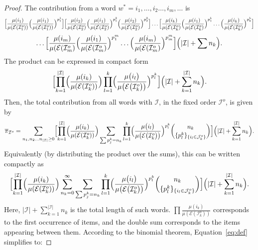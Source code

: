 \documentclass[11pt]{article}
\begin{document}
\begin{proof}
	The contribution from a word $w^*=i_1,\dots,i_2\dots,i_m,\dots$ is $$
	\Bigl[\frac{\mu(i_1)}{\mu(\mathcal{E}(\mathcal{I}^o_1))}
	\Bigl(\frac{\mu(i_1)}{\mu(\mathcal{E}(\mathcal{I}^o_1))}\Bigr)^{p_1^1}\Bigr]
	\Bigl[\frac{\mu(i_2)}{\mu(\mathcal{E}(\mathcal{I}^o_2)}
	\Bigl(\frac{\mu(i_1)}{\mu(\mathcal{E}(\mathcal{I}^o_2)}\Bigr)^{p_1^2}
	\Bigl(\frac{\mu(i_2)}{\mu(\mathcal{E}(\mathcal{I}^o_2)}\Bigr)^{p_2^2}\Bigr]\dots
	\Bigl[\frac{\mu(i_k)}{\mu(\mathcal{E}(\mathcal{I}^o_k)}
	\Bigl(\frac{\mu(i_1)}{\mu(\mathcal{E}(\mathcal{I}^o_k)}\Bigr)^{p_1^k}\dots
	\Bigl(\frac{\mu(i_k)}{\mu(\mathcal{E}(\mathcal{I}^o_k)}\Bigr)^{p_k^k}\Bigr]$$ $$\dots\Bigl[\frac{\mu(i_m)}{\mu(\mathcal{E}(\mathcal{I}^o_m)}
	\Bigl(\frac{\mu(i_1)}{\mu(\mathcal{E}(\mathcal{I}^o_m)}\Bigr)^{p_1^m}\dots
	\Bigl(\frac{\mu(i_m)}{\mu(\mathcal{E}(\mathcal{I}^o_m)}\Bigr)^{p_m^m}\Bigr]\Bigl(|\mathcal{I}|+\sum n_k\Bigr).$$ 
	The product can be expressed in compact form
	$$\Bigl[\prod_{k=1}^{|\mathcal{I}|}\Bigl(\frac{\mu({i_k})}{\mu({\mathcal{E}(\mathcal{I}_k^o)})}\Bigr)\prod_{l=1}^k\Bigl(\frac{\mu\bigl({i_l}\bigr)}{\mu\bigl({\mathcal{E}\bigl(\mathcal{I}_k^o\bigr)}\bigr)}\Bigr)^{p_l^k}\Bigr]\Bigl(|\mathcal{I}|+\sum_{k=1}^{|\mathcal{I}|} n_k\Bigr).$$
	Then, the total contribution from all words with $\mathcal{I}$, in the fixed order $\mathcal{I}^o$, is given by
	$$
	\overline{\pi}_{\mathcal{I}^o}=\sum_{n_1,n_2\dots n_{|\mathcal{I}|}\geq0}\Bigl[\prod_{k=1}^{|\mathcal{I}|}\Bigl(\frac{\mu({i_k})}{\mu({\mathcal{E}(\mathcal{I}_k^o)})}\Bigr)\sum_{\sum p^k_j=n_k} \prod_{l=1}^k\Bigl(\frac{\mu\bigl({i_l}\bigr)}{\mu\bigl({\mathcal{E}\bigl(\mathcal{I}_k^o\bigr)}\bigr)}\Bigr)^{p_l^k}\binom{n_k}{\{p_l^k\}_{\{i_l\in\mathcal{J}_k^o\}}}\Bigr]\Bigl(|\mathcal{I}|+\sum_{k=1}^{|\mathcal{I}|} n_k\Bigr).
	$$
	Equivalently (by distributing the product over the sums), this can be written compactly as
	\begin{equation}\label{eq:def}
		\Bigl[\prod_{k=1}^{|\mathcal{I}|}\Bigl(\frac{\mu({i_k})}{\mu({\mathcal{E}(\mathcal{I}_k^o)})}\Bigr) \sum_{n_k=0}^{\infty} \sum_{\sum p^k_j=n_k} \prod_{l=1}^k\Bigl(\frac{\mu\bigl({i_l}\bigr)}{\mu\bigl({\mathcal{E}\bigl(\mathcal{I}_k^o\bigr)}\bigr)}\Bigr)^{p_l^k}\binom{n_k}{\{p_l^k\}_{\{i_l\in\mathcal{J}_k^o\}}}\Bigr]\Bigl(|\mathcal{I}|+\sum_{k=1}^{|\mathcal{I}|} n_k\Bigr).
	\end{equation}
	Here, $|\mathcal{I}|+\sum_{k=1}^{|\mathcal{I}|} n_k$ is the total length of such words. $\prod\frac{\mu({i_k})}{\mu({\mathcal{E}(\mathcal{I}_k^o)})}$ corresponds to the first occurrence of items, and the double sum corresponds to the items appearing between them. According to the binomial theorem, Equation~\eqref{eq:def} simplifies to:

\end{proof}
\end{document}
